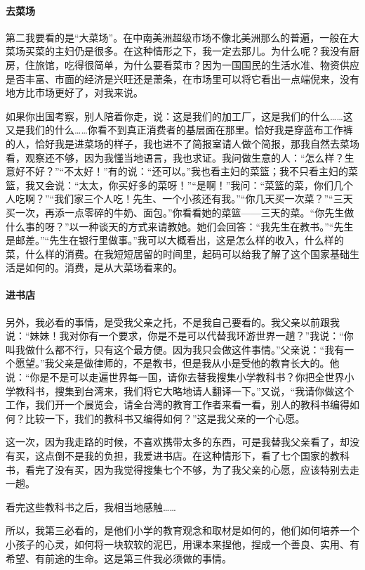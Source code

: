 \paragraph*{去菜场}
\par 第二我要看的是“大菜场”。在中南美洲超级市场不像北美洲那么的普遍，一般在大菜场买菜的主妇仍是很多。在这种情形之下，我一定去那儿。为什么呢？我没有厨房，住旅馆，吃得很简单，为什么要看菜市？因为一国国民的生活水准、物资供应是否丰富、市面的经济是兴旺还是萧条，在市场里可以将它看出一点端倪来，没有地方比市场更好了，对我来说。
\par 如果你出国考察，别人陪着你走，说：这是我们的加工厂，这是我们的什么……这又是我们的什么……你看不到真正消费者的基层面在那里。恰好我是穿蓝布工作裤的人，恰好我是进菜场的样子，我也进不了简报室请人做个简报，那我自然去菜场看，观察还不够，因为我懂当地语言，我也求证。我问做生意的人：“怎么样？生意好不好？”“不太好！”有的说：“还可以。”我也看主妇的菜篮；我不只看主妇的菜篮，我又会说：“太太，你买好多的菜呀！”“是啊！”我问：“菜篮的菜，你们几个人吃啊？”“我们家三个人吃！先生、一个小孩还有我。”“你几天买一次菜？”“三天买一次，再添一点零碎的牛奶、面包。”你看看她的菜篮——三天的菜。“你先生做什么事的呀？”以一种谈天的方式来请教她。她们会回答：“我先生在教书。”“先生是邮差。”“先生在银行里做事。”我可以大概看出，这是怎么样的收入，什么样的菜，什么样的消费。在我短短居留的时间里，起码可以给我了解了这个国家基础生活是如何的。消费，是从大菜场看来的。
\paragraph*{进书店}
\par 另外，我必看的事情，是受我父亲之托，不是我自己要看的。我父亲以前跟我说：“妹妹！我对你有一个要求，你是不是可以代替我环游世界一趟？”我说：“你叫我做什么都不行，只有这个最方便。因为我只会做这件事情。”父亲说：“我有一个愿望。”我父亲是做律师的，不是教书，但是我从小是受他的教育长大的。他说：“你是不是可以走遍世界每一国，请你去替我搜集小学教科书？你把全世界小学教科书，搜集到台湾来，我们将它大略地请人翻译一下。”又说，“我请你做这个工作，我们开一个展览会，请全台湾的教育工作者来看一看，别人的教科书编得如何？比较一下，我们的教科书又编得如何？”这是我父亲的一个心愿。
\par 这一次，因为我走路的时候，不喜欢携带太多的东西，可是我替我父亲看了，却没有买，这点倒不是我的负担，我爱进书店。在这种情形下，看了七个国家的教科书，看完了没有买，因为我觉得搜集七个不够，为了我父亲的心愿，应该特别去走一趟。
\par 看完这些教科书之后，我相当地感触……
\par 所以，我第三必看的，是他们小学的教育观念和取材是如何的，他们如何培养一个小孩子的心灵，如何将一块软软的泥巴，用课本来捏他，捏成一个善良、实用、有希望、有前途的生命。这是第三件我必须做的事情。
